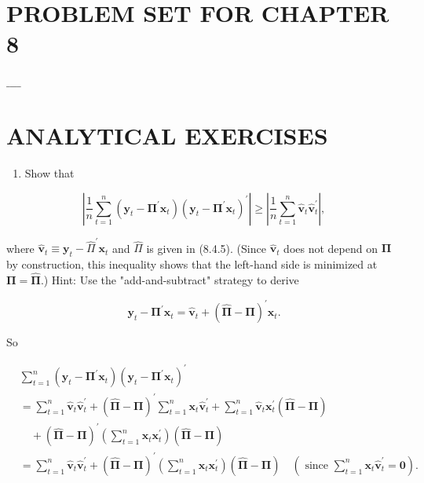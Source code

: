 \documentclass[10pt]{article}
\begin{document}
\section*{PROBLEM SET FOR CHAPTER 8}
$\_\_\_\_$

\section*{ANALYTICAL EXERCISES}
\begin{enumerate}
  \item Show that
\end{enumerate}


\begin{equation*}
\left|\frac{1}{n} \sum_{t=1}^{n}\left(\mathbf{y}_{t}-\boldsymbol{\Pi}^{\prime} \mathbf{x}_{t}\right)\left(\mathbf{y}_{t}-\boldsymbol{\Pi}^{\prime} \mathbf{x}_{t}\right)^{\prime}\right| \geq\left|\frac{1}{n} \sum_{t=1}^{n} \hat{\mathbf{v}}_{t} \hat{\mathbf{v}}_{t}^{\prime}\right|, \tag{1}
\end{equation*}


where $\hat{\mathbf{v}}_{t} \equiv \mathbf{y}_{t}-\widehat{\Pi}^{\prime} \mathbf{x}_{t}$ and $\widehat{\Pi}$ is given in (8.4.5). (Since $\hat{\mathbf{v}}_{t}$ does not depend on $\boldsymbol{\Pi}$ by construction, this inequality shows that the left-hand side is minimized at $\boldsymbol{\Pi}=\widehat{\boldsymbol{\Pi}}$.) Hint: Use the "add-and-subtract" strategy to derive

$$
\mathbf{y}_{t}-\boldsymbol{\Pi}^{\prime} \mathbf{x}_{t}=\hat{\mathbf{v}}_{t}+(\widehat{\boldsymbol{\Pi}}-\boldsymbol{\Pi})^{\prime} \mathbf{x}_{t} .
$$

So

$$
\begin{aligned}
& \sum_{t=1}^{n}\left(\mathbf{y}_{t}-\boldsymbol{\Pi}^{\prime} \mathbf{x}_{t}\right)\left(\mathbf{y}_{t}-\boldsymbol{\Pi}^{\prime} \mathbf{x}_{t}\right)^{\prime} \\
& =\sum_{t=1}^{n} \hat{\mathbf{v}}_{t} \hat{\mathbf{v}}_{t}^{\prime}+(\widehat{\boldsymbol{\Pi}}-\boldsymbol{\Pi})^{\prime} \sum_{t=1}^{n} \mathbf{x}_{t} \hat{\mathbf{v}}_{t}^{\prime}+\sum_{t=1}^{n} \hat{\mathbf{v}}_{t} \mathbf{x}_{t}^{\prime}(\widehat{\boldsymbol{\Pi}}-\boldsymbol{\Pi}) \\
& \quad+(\widehat{\boldsymbol{\Pi}}-\boldsymbol{\Pi})^{\prime}\left(\sum_{t=1}^{n} \mathbf{x}_{t} \mathbf{x}_{t}^{\prime}\right)(\widehat{\boldsymbol{\Pi}}-\boldsymbol{\Pi}) \\
& =\sum_{t=1}^{n} \hat{\mathbf{v}}_{t} \hat{\mathbf{v}}_{t}^{\prime}+(\widehat{\boldsymbol{\Pi}}-\boldsymbol{\Pi})^{\prime}\left(\sum_{t=1}^{n} \mathbf{x}_{t} \mathbf{x}_{t}^{\prime}\right)(\widehat{\boldsymbol{\Pi}}-\boldsymbol{\Pi}) \quad\left(\text { since } \sum_{t=1}^{n} \mathbf{x}_{t} \hat{\mathbf{v}}_{t}^{\prime}=\mathbf{0}\right) .
\end{aligned}
$$
\end{document}
